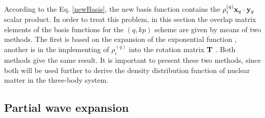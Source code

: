 \documentclass[
12pt, %
oneside, %
english, %
onehalfspacing, %
onehalfspacing, %
headsepline, %
]{MastersDoctoralThesis} %
\begin{document}
According to the Eq. \ref{newBasis}, the new basis function  contains the $\rho^{(q)}_i {\bf x}_{q} \cdot {\bf y}_{q}$ scalar product. In order to treat this problem,  in this section the overlap matrix elements of the basis functions for the $\left(q, kp \right)$ scheme are given by means of two methods.  
The first is based on the expansion of the exponential function \cite{suzuki1998stochastic}, another is in the implementing of $\rho^{(q)}_i$ into the rotation matrix ${\bf T}$ \cite{kukulin1990dynamic}. Both methods give the same result. 
It is important to present these two methods, since both will be used further to derive the density distribution function of nuclear matter in the three-body system.



\subsection{Partial wave expansion}
\label{overlap_by_exp}
\end{document}
